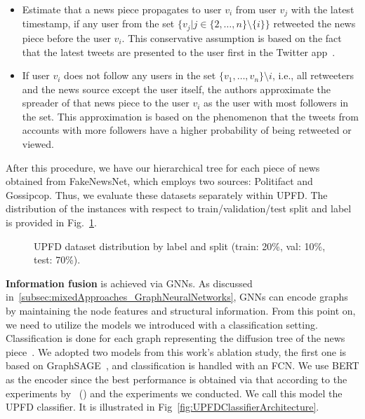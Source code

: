 \begin{itemize}
    \item Estimate that a news piece propagates to user $v_i$ from user $v_j$ with the latest timestamp, if any user from the set $\{v_j | j\in \{2, \dots, n\}\setminus \{i\}\}$ retweeted the news piece before the user $v_i$. This conservative assumption is based on the fact that the latest tweets are presented to the user first in the Twitter app~\parencite{UPFD_Dataset_Shu}.
    \item If user $v_i$ does not follow any users in the set $\{v_1, \dots, v_n \} \setminus {i}$, i.e., all retweeters and the news source except the user itself, the authors approximate the spreader of that news piece to the user $v_i$ as the user with most followers in the set. This approximation is based on the phenomenon that the tweets from accounts with more followers have a higher probability of being retweeted or viewed.
\end{itemize}
After this procedure, we have our hierarchical tree for each piece of news obtained from FakeNewsNet, which employs two sources: Politifact and Gossipcop. Thus, we evaluate these datasets separately within UPFD. The distribution of the instances with respect to train/validation/test split and label is provided in Fig.~\ref{fig:UPFD_Dataset_Visualization}.\\
\begin{figure}
    \hfill
    \caption[UPFD dataset distribution by label and split.]{UPFD dataset distribution by label and split (train: 20\%, val: 10\%, test: 70\%).}
    \label{fig:UPFD_Dataset_Visualization}
\end{figure}
\textbf{Information fusion} is achieved via GNNs. As discussed in~\ref{subsec:mixedApproaches_GraphNeuralNetworks}, GNNs can encode graphs by maintaining the node features and structural information. From this point on, we need to utilize the models we introduced with a classification setting. Classification is done for each graph representing the diffusion tree of the news piece~\parencite{UPFD_Dataset_Shu}. We adopted two models from this work's ablation study, the first one is based on GraphSAGE~\parencite{GraphSAGE_Hamilton}, and classification is handled with an FCN. We use BERT as the encoder since the best performance is obtained via that according to the experiments by~\citeauthor{UPFD_Dataset_Shu} (\citeyear{UPFD_Dataset_Shu}) and the experiments we conducted. We call this model the UPFD classifier. It is illustrated in Fig~\ref{fig:UPFDClassifierArchitecture}.\\
